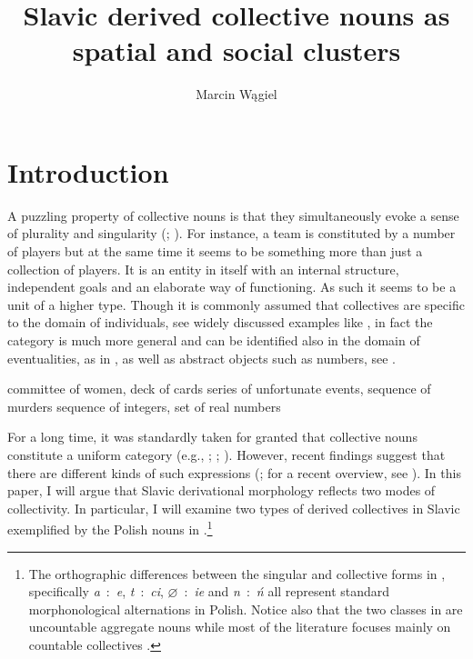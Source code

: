 \documentclass[output=paper]{langscibook}
\author{Marcin Wągiel\affiliation{Masaryk University}}
\title{Slavic derived collective nouns as spatial and social clusters}
\begin{document}
\maketitle

\section{Introduction}\label{wan:sec:introduction}

A puzzling property of collective nouns is that they simultaneously evoke a sense of plurality and singularity (\citealt[195]{jespersen1924philosophy}; \citealt{gil1996maltese}). For instance, a team is constituted by a number of players but at the same time it seems to be something more than just a collection of players. It is an entity in itself with an internal structure, independent goals and an elaborate way of functioning. As such it seems to be a unit of a higher type. Though it is commonly assumed that collectives are specific to the domain of individuals, see widely discussed examples like , in fact the category is much more general and can be identified also in the domain of eventualities, as in , as well as abstract objects such as numbers, see .

\ea \ea committee of women, deck of cards\label{wan:ex:collectives-individuals}
\ex series of unfortunate events, sequence of murders\label{wan:ex:collectives-eventualities}
\ex sequence of integers, set of real numbers\label{wan:ex:collectives-numbers}
\z
\z

\noindent For a long time, it was standardly taken for granted that collective nouns constitute a uniform category (e.g., \citealt{landman1989groupsi}; \citealt{barker1992group}; \citealt{schwarzschild1996pluralities}). However, recent findings suggest that there are different kinds of such expressions (\citealt{joosten2010collective,pearson2011new,de_vries2015shifting,henderson2017swarms,zwarts2020contiguity}; for a recent overview, see \citealt{de_vries-toappear-collective}). In this paper, I will argue that Slavic derivational morphology reflects two modes of collectivity. In particular, I will examine two types of derived collectives in Slavic exemplified by the Polish nouns in .\footnote{The orthographic differences between the singular and collective forms in , specifically \textit{a}~:~\textit{e}, \textit{t}~:~\textit{ci}, $\varnothing$~:~\textit{ie} and \textit{n}~:~\textit{ń} all represent standard morphonological alternations in Polish. Notice also that the two classes in  are uncountable aggregate nouns while most of the literature focuses mainly on countable collectives \citep[but see][]{de_vries-toappear-collective}.}
\end{document}
